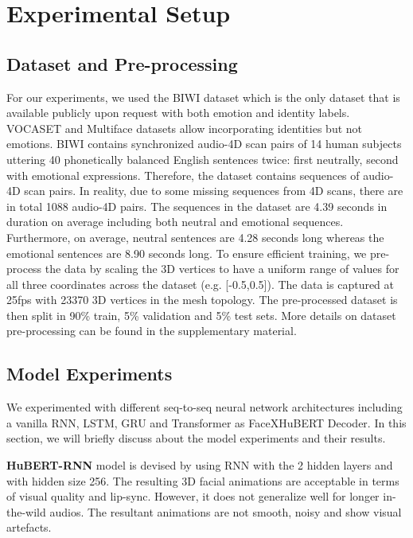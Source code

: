 \documentclass[10pt,twocolumn,letterpaper]{article}
\begin{document}
\section{Experimental Setup}

\subsection{Dataset and Pre-processing}
For our experiments, we used the BIWI\cite{eth_biwi_00760} dataset which is the only dataset that is available publicly upon request with both emotion and identity labels. VOCASET\cite{VOCASET} and Multiface\cite{multiface} datasets allow incorporating identities but not emotions. BIWI contains synchronized audio-4D scan pairs of 14 human subjects uttering 40 phonetically balanced English sentences twice: first neutrally, second with emotional expressions. Therefore, the dataset contains  sequences of audio-4D scan pairs. In reality, due to some missing sequences from 4D scans, there are in total 1088 audio-4D pairs. The sequences in the dataset are 4.39 seconds in duration on average including both neutral and emotional sequences. Furthermore, on average, neutral sentences are 4.28 seconds long whereas the emotional sentences are 8.90 seconds long. To ensure efficient training, we pre-process the data by scaling the 3D vertices to have a uniform range of values for all three coordinates across the dataset (e.g. [-0.5,0.5]). The data is captured at 25fps with 23370 3D vertices in the mesh topology. The pre-processed dataset is then split in 90\% train, 5\% validation and 5\% test sets. More details on dataset pre-processing can be found in the supplementary material. 


\subsection{Model Experiments}
\label{sec:experiments}
We experimented with different seq-to-seq neural network architectures including a vanilla RNN, LSTM, GRU and Transformer as FaceXHuBERT Decoder. In this section, we will briefly discuss about the model experiments and their results. 


\noindent\textbf{HuBERT-RNN} model is devised by using RNN with the 2 hidden layers and with hidden size 256. The resulting 3D facial animations are acceptable in terms of visual quality and lip-sync. However, it does not generalize well for longer in-the-wild audios. The resultant animations are not smooth, noisy and show visual artefacts. 
\end{document}
